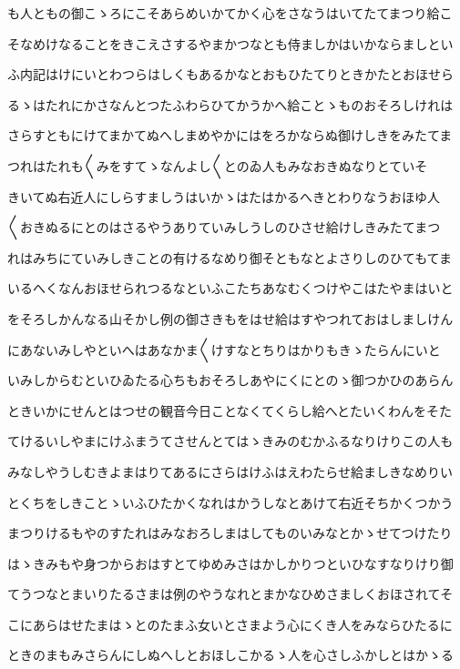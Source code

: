 \documentclass[a4paper,11pt,landscape]{ltjtarticle}
\begin{document}
も人ともの御こゝろにこそあらめいかてかく心をさなうはいてたてまつり給こ
\par\medskip
そなめけなることをきこえさするやまかつなとも侍ましかはいかならましとい
\par\medskip
ふ内記はけにいとわつらはしくもあるかなとおもひたてりときかたとおほせら
\par\medskip
るゝはたれにかさなんとつたふわらひてかうかへ給ことゝものおそろしけれは
\par\medskip
さらすともにけてまかてぬへしまめやかにはをろかならぬ御けしきをみたてま
\par\medskip
つれはたれも〱みをすてゝなんよし〱とのゐ人もみなおきぬなりとていそ
\par\medskip
きいてぬ右近人にしらすましうはいかゝはたはかるへきとわりなうおほゆ人
\par\medskip
〱おきぬるにとのはさるやうありていみしうしのひさせ給けしきみたてまつ
\par\medskip
れはみちにていみしきことの有けるなめり御そともなとよさりしのひてもてま
\par\medskip
いるへくなんおほせられつるなといふこたちあなむくつけやこはたやまはいと
\par\medskip
をそろしかんなる山そかし例の御さきもをはせ給はすやつれておはしましけん
\par\medskip
にあないみしやといへはあなかま〱けすなとちりはかりもきゝたらんにいと
\par\medskip
いみしからむといひゐたる心ちもおそろしあやにくにとのゝ御つかひのあらん
\par\medskip
ときいかにせんとはつせの観音今日ことなくてくらし給へとたいくわんをそた
\par\medskip
てけるいしやまにけふまうてさせんとてはゝきみのむかふるなりけりこの人も
\par\medskip
みなしやうしむきよまはりてあるにさらはけふはえわたらせ給ましきなめりい
\par\medskip
とくちをしきことゝいふひたかくなれはかうしなとあけて右近そちかくつかう
\par\medskip
まつりけるもやのすたれはみなおろしまはしてものいみなとかゝせてつけたり
\par\medskip
はゝきみもや身つからおはすとてゆめみさはかしかりつといひなすなりけり御
\par\medskip
てうつなとまいりたるさまは例のやうなれとまかなひめさましくおほされてそ
\par\medskip
こにあらはせたまはゝとのたまふ女いとさまよう心にくき人をみならひたるに
\par\medskip
ときのまもみさらんにしぬへしとおほしこかるゝ人を心さしふかしとはかゝる
\end{document}
